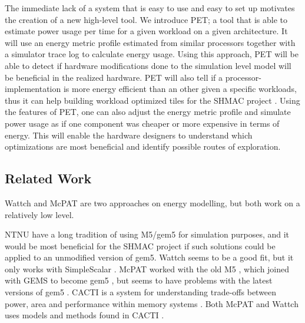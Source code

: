 The immediate lack of a system that is easy to use and easy to set up motivates
the creation of a new high-level tool. We introduce PET; a tool that is able to
estimate power usage per time for a given workload on a given architecture. It
will use an energy metric profile estimated from similar processors together
with a simulator trace log to calculate energy usage. Using this approach, PET
will be able to detect if hardware modifications done to the simulation level
model will be beneficial in the realized hardware. PET will also tell if a
processor-implementation is more energy efficient than an other given a specific
workloads, thus it can help building workload optimized tiles for the SHMAC
project \cite{shmacwebpage}. Using the features of PET, one can also adjust the
energy metric profile and simulate power usage as if one component was cheaper
or more expensive in terms of energy. This will enable the hardware designers to
understand which optimizations are most beneficial and identify possible routes
of exploration.


\subsection{Related Work}

Wattch \cite{brooks2000wattch} and McPAT \cite{hpmcpat,li2013mcpat} are two
approaches on energy modelling, but both work on a relatively low level.

NTNU have a long tradition of using M5/gem5 for simulation purposes, and it
would be most beneficial for the SHMAC project if such solutions could be
applied to an unmodified version of gem5. Wattch seems to be a good fit, but it
only works with SimpleScalar \cite{wattchanalysis}. McPAT worked with the old M5
\cite{m5mcpatparser}, which joined with GEMS to become gem5 \cite{gem5hipeac},
but seems to have problems with the latest versions of gem5
\cite{mcpatgem5problems}. CACTI is a system for understanding trade-offs between
power, area and performance within memory systems
\cite{hpcacti,muralimanohar2010memory}. Both McPAT and Wattch uses models and
methods found in CACTI \cite{li2009mcpat}.



